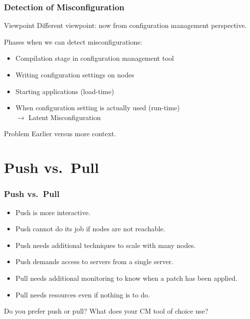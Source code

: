 \begin{frame}
	\frametitle{Detection of Misconfiguration}

	\begin{alertblock}{Viewpoint}
	Different viewpoint: now from configuration management perspective.
	\end{alertblock}

	Phases when we can detect misconfigurations:
	\begin{itemize}[<+-| alert@+>]
	\item Compilation stage in configuration management tool
	\item Writing configuration settings on nodes
	\item Starting applications (load-time)
	\item When configuration setting is actually used (run-time) \\
		$\rightarrow$ Latent Misconfiguration
	\end{itemize}

	\pause[\thebeamerpauses]

	\begin{alertblock}{Problem}
	Earlier versus more context.
	\end{alertblock}
\end{frame}

\section{Push vs.\ Pull}

\begin{frame}
	\frametitle{Push vs.\ Pull}

	\begin{itemize}[<+-| alert@+>]
	\item Push is more interactive.
	\item Push cannot do its job if nodes are not reachable.
	\item Push needs additional techniques to scale with many nodes.
	\item Push demands access to servers from a single server.
	\item Pull needs additional monitoring to know when a patch has been applied.
	\item Pull needs resources even if nothing is to do.
	\end{itemize}

	\pause[\thebeamerpauses]

	\begin{task}
	Do you prefer push or pull?
	What does your CM tool of choice use?
	\end{task}
\end{frame}

